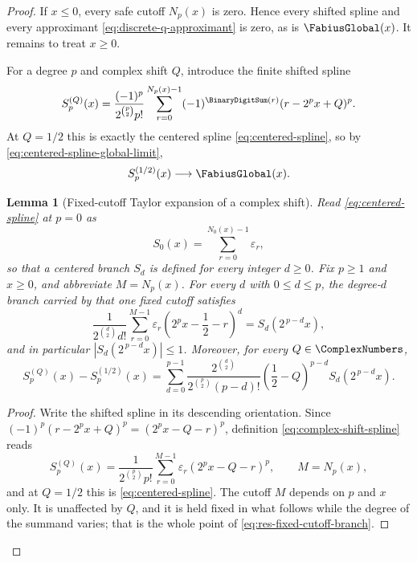 \documentclass[11pt,oneside]{article}
\newtheorem{lemma}[theorem]{Lemma}
\theoremstyle{definition}
\theoremstyle{remark}
\begin{document}
\begin{proof}
If $x\le0$, every safe cutoff $N_p(x)$ is zero.  Hence every shifted spline and every
approximant \eqref{eq:discrete-q-approximant} is zero, as is $\FabiusGlobal(x)$.  It remains
to treat $x\ge0$.

For a degree $p$ and complex shift $Q$, introduce the finite shifted spline
\begin{equation}
 S_p^{(Q)}(x)=
 \frac{(-1)^p}{2^{\binom p2}p!}
 \sum_{r=0}^{N_p(x)-1}(-1)^{\BinaryDigitSum(r)}
 (r-2^px+Q)^p.                                           \label{eq:complex-shift-spline}
\end{equation}
At $Q=1/2$ this is exactly the centered spline
\eqref{eq:centered-spline}, so by \eqref{eq:centered-spline-global-limit},
\begin{equation*}
 S_p^{(1/2)}(x)\longrightarrow\FabiusGlobal(x).
\end{equation*}
\begin{lemma}[Fixed-cutoff Taylor expansion of a complex shift]
\label{lem:res-spline-taylor}
Read \eqref{eq:centered-spline} at $p=0$ as
\begin{equation}
 S_0(x)=\sum_{r=0}^{N_0(x)-1}\varepsilon_r,               \label{eq:res-degree-zero-spline}
\end{equation}
so that a centered branch $S_d$ is defined for every integer $d\ge0$.  Fix $p\ge1$ and
$x\ge0$, and abbreviate $M=N_p(x)$.  For every $d$ with $0\le d\le p$, the degree-$d$ branch
carried by that one fixed cutoff satisfies
\begin{equation}
 \frac1{2^{\binom d2}d!}\sum_{r=0}^{M-1}\varepsilon_r
 \left(2^px-\frac12-r\right)^{d}
 =S_d\!\left(2^{\,p-d}x\right),                           \label{eq:res-fixed-cutoff-branch}
\end{equation}
and in particular $\left|S_d\!\left(2^{\,p-d}x\right)\right|\le1$.  Moreover, for every
$Q\in\ComplexNumbers$,
\begin{equation}
 S_p^{(Q)}(x)-S_p^{(1/2)}(x)
 =\sum_{d=0}^{p-1}
 \frac{2^{\binom d2}}{2^{\binom p2}(p-d)!}
 \left(\frac12-Q\right)^{p-d}
 S_d\!\left(2^{\,p-d}x\right).                            \label{eq:res-spline-taylor}
\end{equation}
\end{lemma}

\begin{proof}
Write the shifted spline in its descending orientation.  Since
$(-1)^p(r-2^px+Q)^p=(2^px-Q-r)^p$, definition \eqref{eq:complex-shift-spline} reads
\begin{equation}
 S_p^{(Q)}(x)=\frac1{2^{\binom p2}p!}
 \sum_{r=0}^{M-1}\varepsilon_r\left(2^px-Q-r\right)^{p},
 \qquad M=N_p(x),                                         \label{eq:res-descending-spline}
\end{equation}
and at $Q=1/2$ this is \eqref{eq:centered-spline}.  The cutoff $M$ depends on $p$ and $x$
only.  It is unaffected by $Q$, and it is held fixed in what follows while the degree of the
summand varies; that is the whole point of \eqref{eq:res-fixed-cutoff-branch}.


\end{proof}
\end{proof}
\end{document}
